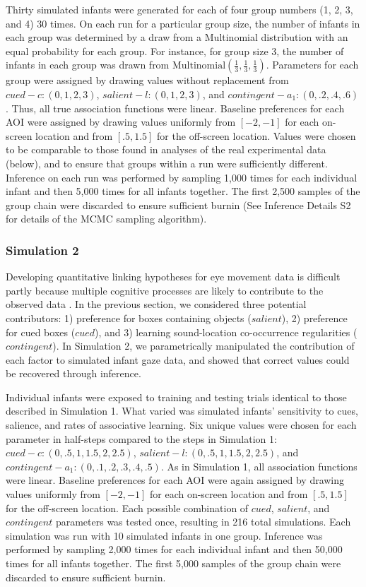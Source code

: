 \documentclass[12pt]{article}
\begin{document}
	Thirty simulated infants were generated for each of four group numbers (1, 2, 3, and 4) 30 times. On each run for a particular group size, the number of infants in each group was determined by a draw from a Multinomial distribution with an equal probability for each group. For instance, for group size 3, the number of infants in each group was drawn from $\text{Multinomial}(\frac{1}{3},\frac{1}{3},\frac{1}{3})$. Parameters for each group were assigned by drawing values without replacement from $cued - c: (0,1,2,3)$, $salient -  l: (0,1,2,3)$, and $contingent - a_{1}: (0,.2,.4,.6)$. Thus, all true association functions were linear. Baseline preferences for each AOI were assigned by drawing values uniformly from $[-2,-1]$ for each on-screen location and from $[.5,1.5]$  for the off-screen location. Values were chosen to be comparable to those found in analyses of the real experimental data (below), and to ensure that groups within a run were sufficiently different. Inference on each run was performed by sampling 1,000 times for each individual infant and then 5,000 times for all infants together. The first 2,500 samples of the group chain were discarded to ensure sufficient burnin (See Inference Details S2 for details of the MCMC sampling algorithm).

\subsubsection*{Simulation 2} 

	Developing quantitative linking hypotheses for eye movement data is difficult partly because multiple cognitive processes are likely to contribute to the observed data \cite{Aslin2007, Sirois2004, Hayhoe2005}. In the previous section, we considered three potential contributors: 1) preference for boxes containing objects ($salient$), 2) preference for cued boxes ($cued$), and 3) learning sound-location co-occurrence regularities ($contingent$). In Simulation 2, we parametrically manipulated the contribution of each factor to simulated infant gaze data, and showed that correct values could be recovered through inference.

	Individual infants were exposed to training and testing trials identical to those described in Simulation 1. What varied was simulated infants' sensitivity to cues, salience, and rates of associative learning. Six unique values were chosen for each parameter in half-steps compared to the steps in Simulation 1: $cued - c: (0,.5,1,1.5,2,2.5)$, $salient - l: (0,.5,1,1.5,2,2.5)$, and $contingent - a_{1}: (0,.1,.2,.3,.4,.5)$. As in Simulation 1, all association functions were linear. Baseline preferences for each AOI were again assigned by drawing values uniformly from $[-2,-1]$ for each on-screen location and from $[.5,1.5]$ for the off-screen location. Each possible combination of $cued$, $salient$, and $contingent$ parameters was tested once, resulting in 216 total simulations. Each simulation was run with 10 simulated infants in one group. Inference was performed by sampling 2,000 times for each individual infant and then 50,000 times for all infants together. The first 5,000 samples of the group chain were discarded to ensure sufficient burnin.
\end{document}
